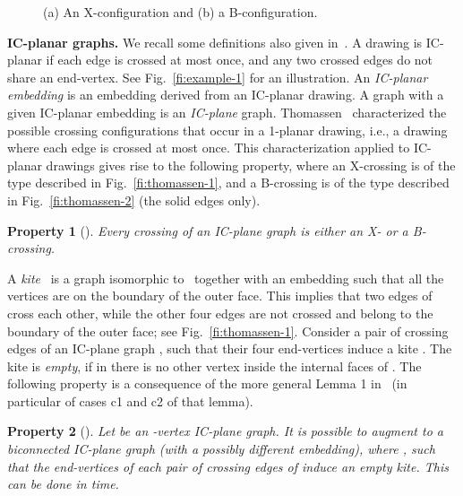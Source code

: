 \documentclass[a4paper]{article}
\newtheorem{property}{Property}
\begin{document}
\begin{figure}[t]
    \centering
    \hfil
  \caption{\small (a) An X-configuration and (b) a B-configuration.}
\end{figure}

{\bf IC-planar graphs.} We recall some definitions also given in~\cite{bdek+-rdicg-15}. A drawing is IC-planar if each edge is crossed at most once, and any two crossed edges do not share an end-vertex. See Fig.~\ref{fi:example-1} for an illustration. An \emph{IC-planar embedding} is an embedding derived from an IC-planar drawing. A graph with a given IC-planar embedding is an \emph{IC-plane} graph. Thomassen~\cite{t-rdg-JGT88} characterized the possible crossing configurations that occur in a 1-planar drawing, i.e., a drawing where each edge is crossed at most once. This characterization applied to IC-planar drawings gives rise to the following property, where an X-crossing is of the  type described in Fig.~\ref{fi:thomassen-1}, and a B-crossing is of the type described in Fig.~\ref{fi:thomassen-2} (the solid edges only). 

\begin{property}[\cite{bdek+-rdicg-15}]\label{pr:char-crossins}
  Every crossing of an IC-plane graph is either an X- or a B-crossing.
\end{property}
A \emph{kite}~ is a graph isomorphic to~ together with an embedding such that all the vertices are on the boundary of the outer face. This implies that two edges of~ cross each other, while the other four edges are not crossed and  belong to the boundary of the outer face; see Fig.~\ref{fi:thomassen-1}. Consider a pair of crossing edges of an IC-plane graph , such that their four end-vertices induce a kite . The kite  is \emph{empty}, if in  there is no other vertex inside the internal faces of . The following property is a consequence of the more general Lemma 1 in~\cite{bdek+-rdicg-15} (in particular of cases c1 and c2 of that lemma). 

\begin{property}[\cite{bdek+-rdicg-15}]\label{pr:augmentation}
Let  be an -vertex IC-plane graph. It is possible to augment  to a biconnected IC-plane graph  (with a possibly different embedding), where , such that the end-vertices of each pair of crossing edges of  induce an empty kite. This can be done in  time.
\end{property}
\end{document}

